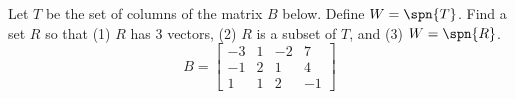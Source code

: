 Let $T$ be the set of columns of the matrix $B$ below.  Define $W=\spn{T}$.  Find a set $R$ so that (1) $R$ has 3 vectors, (2) $R$ is a subset of $T$, and (3) $W=\spn{R}$.
%
\begin{equation*}
B=
\begin{bmatrix}
-3 & 1 & -2 & 7\\ 
-1 & 2 & 1 & 4\\ 
1 & 1 & 2 & -1
\end{bmatrix}
\end{equation*}
%
